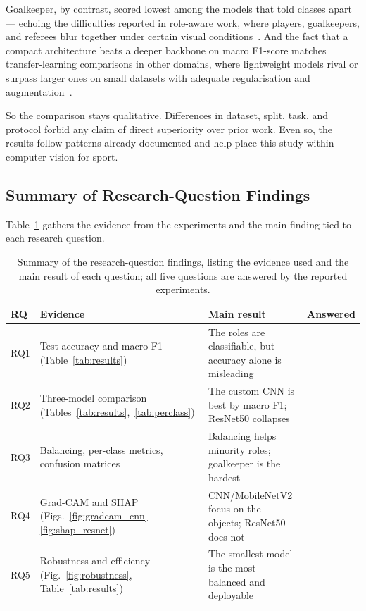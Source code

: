 \documentclass[preprint,12pt]{elsarticle}
\newcommand{\cmark}{\ding{51}} %
\begin{document}
Goalkeeper, by contrast, scored lowest among the models that told classes apart --- echoing the difficulties reported in role-aware work, where players, goalkeepers, and referees blur together under certain visual conditions~\cite{somers2024multitask}. And the fact that a compact architecture beats a deeper backbone on macro F1-score matches transfer-learning comparisons in other domains, where lightweight models rival or surpass larger ones on small datasets with adequate regularisation and augmentation~\cite{martins2025mobilenet}.

So the comparison stays qualitative. Differences in dataset, split, task, and protocol forbid any claim of direct superiority over prior work. Even so, the results follow patterns already documented and help place this study within computer vision for sport.

\subsection{Summary of Research-Question Findings}

Table~\ref{tab:rqsummary} gathers the evidence from the experiments and the main finding tied to each research question.

\begin{table}[!ht]
\centering
\caption{Summary of the research-question findings, listing the evidence used and the main result of each question; all five questions are answered by the reported experiments.}
\label{tab:rqsummary}
\begin{tabular}{p{0.6cm} p{3.2cm} p{3.4cm} c}
\toprule
\textbf{RQ} & \textbf{Evidence} & \textbf{Main result} & \textbf{Answered} \\
\midrule
RQ1 & Test accuracy and macro F1 (Table~\ref{tab:results}) & The roles are classifiable, but accuracy alone is misleading & \cmark \\
RQ2 & Three-model comparison (Tables~\ref{tab:results},~\ref{tab:perclass}) & The custom CNN is best by macro F1; ResNet50 collapses & \cmark \\
RQ3 & Balancing, per-class metrics, confusion matrices & Balancing helps minority roles; goalkeeper is the hardest & \cmark \\
RQ4 & Grad-CAM and SHAP (Figs.~\ref{fig:gradcam_cnn}--\ref{fig:shap_resnet}) & CNN/MobileNetV2 focus on the objects; ResNet50 does not & \cmark \\
RQ5 & Robustness and efficiency (Fig.~\ref{fig:robustness}, Table~\ref{tab:results}) & The smallest model is the most balanced and deployable & \cmark \\
\bottomrule
\end{tabular}
\end{table}
\end{document}
